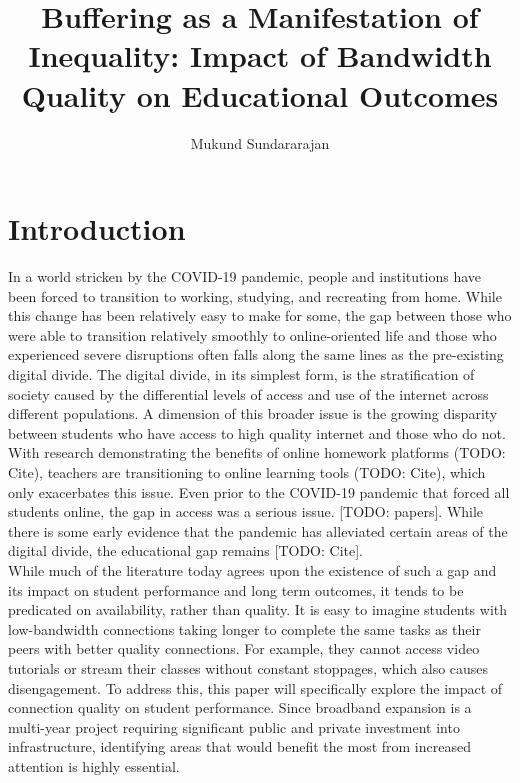 \documentclass[stu, floatsintext]{apa7}
\title{Buffering as a Manifestation of Inequality: Impact of Bandwidth Quality on Educational Outcomes}
\author{Mukund Sundararajan}
\affiliation{University of British Columbia}
\begin{document}
    \maketitle
    \section{Introduction}
    In a world stricken by the COVID-19 pandemic, people and institutions have been forced to transition to working, studying, and recreating from home. While this change has been relatively easy to make for some, the gap between those who were able to transition relatively smoothly to online-oriented life and those who experienced severe disruptions often falls along the same lines as the pre-existing digital divide. The digital divide, in its simplest form, is the stratification of society caused by the differential levels of access and use of the internet across different populations. A dimension of this broader issue is the growing disparity between students who have access to high quality internet and those who do not. \\
    
    With research demonstrating the benefits of online homework platforms (TODO: Cite), teachers are transitioning to online learning tools (TODO: Cite), which only exacerbates this issue. Even prior to the COVID-19 pandemic that forced all students online, the gap in access was a serious issue. [TODO: papers]. While there is some early evidence that the pandemic has alleviated certain areas of the digital divide, the educational gap remains [TODO: Cite]. \\

    While much of the literature today agrees upon the existence of such a gap and its impact on student performance and long term outcomes, it tends to be predicated on availability, rather than quality. It is easy to imagine students with low-bandwidth connections taking longer to complete the same tasks as their peers with better quality connections. For example, they cannot access video tutorials or stream their classes without constant stoppages, which also causes disengagement. To address this, this paper will specifically explore the impact of connection quality on student performance. Since broadband expansion is a multi-year project requiring significant public and private investment into infrastructure, identifying areas that would benefit the most from increased attention is highly essential. \\
\end{document}
